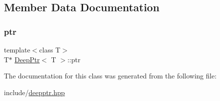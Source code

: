 \subsection{Member Data Documentation}
\mbox{\label{classDeepPtr_aa738303c3bb2c634b6edfee93bdf2a07_aa738303c3bb2c634b6edfee93bdf2a07}} 
\subsubsection{\texorpdfstring{ptr}{ptr}}
{\footnotesize\ttfamily template$<$class T$>$ \\
T$\ast$ \hyperlink{classDeepPtr}{Deep\+Ptr}$<$ T $>$\+::ptr\hspace{0.3cm}{\ttfamily [private]}}



The documentation for this class was generated from the following file\+:\begin{DoxyCompactItemize}
\item 
include/\hyperlink{deepptr_8hpp}{deepptr.\+hpp}\end{DoxyCompactItemize}
